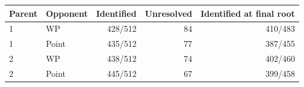 \begin{tabular}{llrrr}
\toprule
Parent & Opponent & Identified & Unresolved & Identified at final root \\
\midrule
1 & WP & 428/512 & 84 & 410/483 \\
1 & Point & 435/512 & 77 & 387/455 \\
2 & WP & 438/512 & 74 & 402/460 \\
2 & Point & 445/512 & 67 & 399/458 \\
\bottomrule
\end{tabular}
